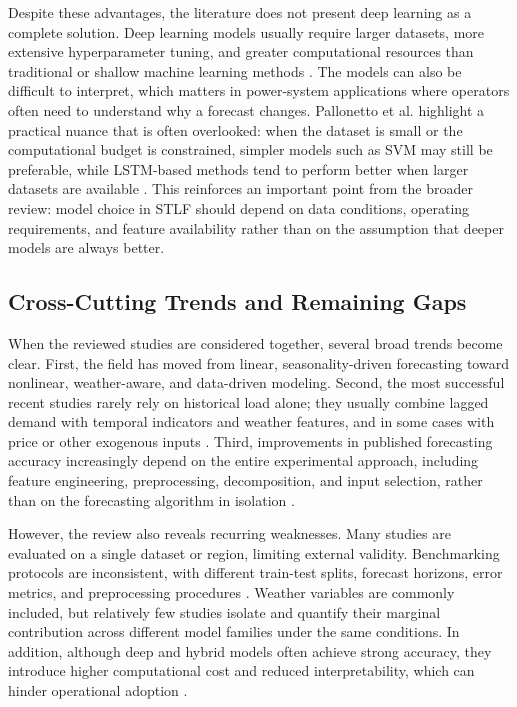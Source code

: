 \documentclass[conference]{IEEEtran}
\begin{document}
Despite these advantages, the literature does not present deep learning as a complete solution. Deep learning models usually require larger datasets, more extensive hyperparameter tuning, and greater computational resources than traditional or shallow machine learning methods \cite{10630814,Eren,bedi2019deep}. The models can also be difficult to interpret, which matters in power-system applications where operators often need to understand why a forecast changes. Pallonetto et al. highlight a practical nuance that is often overlooked: when the dataset is small or the computational budget is constrained, simpler models such as SVM may still be preferable, while LSTM-based methods tend to perform better when larger datasets are available \cite{pallonetto2021}. This reinforces an important point from the broader review: model choice in STLF should depend on data conditions, operating requirements, and feature availability rather than on the assumption that deeper models are always better.

\subsection{Cross-Cutting Trends and Remaining Gaps}
When the reviewed studies are considered together, several broad trends become clear. First, the field has moved from linear, seasonality-driven forecasting toward nonlinear, weather-aware, and data-driven modeling. Second, the most successful recent studies rarely rely on historical load alone; they usually combine lagged demand with temporal indicators and weather features, and in some cases with price or other exogenous inputs \cite{Chen,Pinheiro,Mansouri,10320357}. Third, improvements in published forecasting accuracy increasingly depend on the entire experimental approach, including feature engineering, preprocessing, decomposition, and input selection, rather than on the forecasting algorithm in isolation \cite{vivas2020,khalil2022,zhang2021}.

However, the review also reveals recurring weaknesses. Many studies are evaluated on a single dataset or region, limiting external validity. Benchmarking protocols are inconsistent, with different train-test splits, forecast horizons, error metrics, and preprocessing procedures \cite{vivas2020,khalil2022,habbak2023}. Weather variables are commonly included, but relatively few studies isolate and quantify their marginal contribution across different model families under the same conditions. In addition, although deep and hybrid models often achieve strong accuracy, they introduce higher computational cost and reduced interpretability, which can hinder operational adoption \cite{10630814,Eren,10320357}.
\end{document}
